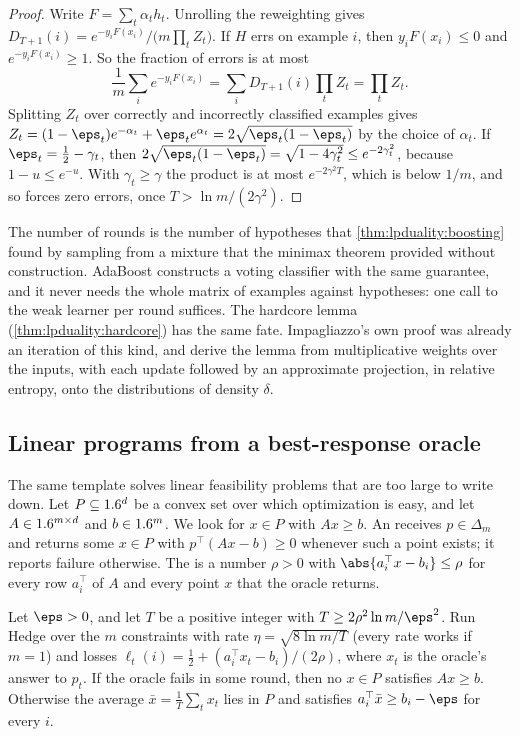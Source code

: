 \begin{refsection}
\begin{proof}
Write $F=\sum_t\alpha_th_t$. Unrolling the reweighting gives $D_{T+1}(i)=e^{-y_iF(x_i)}/\bigl(m\prod_tZ_t\bigr)$. If $H$ errs on example $i$, then $y_iF(x_i)\le0$ and $e^{-y_iF(x_i)}\ge1$. So the fraction of errors is at most
\[
\frac1m\sum_ie^{-y_iF(x_i)}=\sum_iD_{T+1}(i)\prod_tZ_t=\prod_tZ_t .
\]
Splitting $Z_t$ over correctly and incorrectly classified examples gives $Z_t=(1-\eps_t)e^{-\alpha_t}+\eps_te^{\alpha_t}=2\sqrt{\eps_t(1-\eps_t)}$ by the choice of $\alpha_t$. If $\eps_t=\frac12-\gamma_t$, then $2\sqrt{\eps_t(1-\eps_t)}=\sqrt{1-4\gamma_t^2}\le e^{-2\gamma_t^2}$, because $1-u\le e^{-u}$. With $\gamma_t\ge\gamma$ the product is at most $e^{-2\gamma^2T}$, which is below $1/m$, and so forces zero errors, once $T>\ln m/(2\gamma^2)$.
\end{proof}

The number of rounds is the number of hypotheses that \cref{thm:lpduality:boosting} found by sampling from a mixture that the minimax theorem provided without construction. AdaBoost constructs a voting classifier with the same guarantee, and it never needs the whole matrix of examples against hypotheses: one call to the weak learner per round suffices. The hardcore lemma (\cref{thm:lpduality:hardcore}) has the same fate. Impagliazzo's own proof was already an iteration of this kind, and \textcite{BarakHardtKale2009} derive the lemma from multiplicative weights over the inputs, with each update followed by an approximate projection, in relative entropy, onto the distributions of density $\delta$.

\subsection{Linear programs from a best-response oracle}

The same template solves linear feasibility problems that are too large to write down. Let $P\subseteq1.6^d$ be a convex set over which optimization is easy, and let $A\in1.6^{m\times d}$ and $b\in1.6^m$. We look for $x\in P$ with $Ax\ge b$. An  receives $p\in\Delta_m$ and returns some $x\in P$ with $p^\top(Ax-b)\ge0$ whenever such a point exists; it reports failure otherwise. The  is a number $\rho>0$ with $\abs{a_i^\top x-b_i}\le\rho$ for every row $a_i^\top$ of $A$ and every point $x$ that the oracle returns.

\begin{theorem}\label{thm:regret:lp}
Let $\eps>0$, and let $T$ be a positive integer with $T\ge2\rho^2\ln m/\eps^2$. Run Hedge over the $m$ constraints with rate $\eta=\sqrt{8\ln m/T}$ (every rate works if $m=1$) and losses $\ell_t(i)=\frac12+(a_i^\top x_t-b_i)/(2\rho)$, where $x_t$ is the oracle's answer to $p_t$. If the oracle fails in some round, then no $x\in P$ satisfies $Ax\ge b$. Otherwise the average $\bar x=\frac1T\sum_tx_t$ lies in $P$ and satisfies $a_i^\top\bar x\ge b_i-\eps$ for every $i$.
\end{theorem}


\end{refsection}
